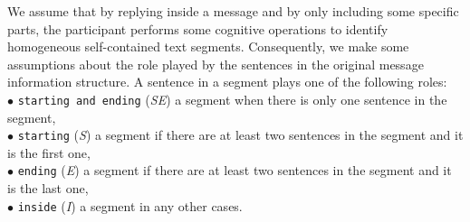 We assume that by replying inside a message and by only including some specific parts, the participant performs some cognitive operations to identify homogeneous self-contained text segments.
Consequently, we make some assumptions about the role played by the sentences in the original message information structure.
%
A sentence in a segment plays one of the following roles: \\
\indent $\bullet$ \texttt{\footnotesize starting and ending} (\textit{SE}) a segment when there is only one sentence in the segment, \\
\indent $\bullet$ \texttt{\footnotesize starting} (\textit{S}) a segment if there are at least two sentences in the segment and it is the first one, \\
\indent $\bullet$ \texttt{\footnotesize ending} (\textit{E}) a segment if there are at least two sentences in the segment and it is the last one, \\
\indent $\bullet$ \texttt{\footnotesize inside} (\textit{I}) a segment in any other cases.
%




